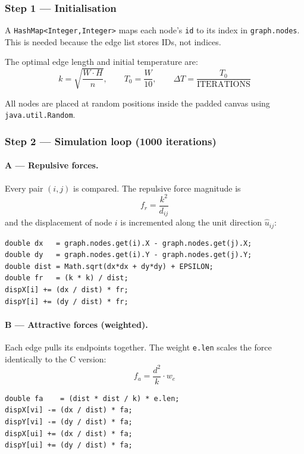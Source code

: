 \documentclass[12pt,a4paper]{article}
\begin{document}
\subsubsection*{Step 1 — Initialisation}

A \texttt{HashMap<Integer,Integer>} maps each node's \texttt{id} to its
index in \texttt{graph.nodes}. This is needed because the edge list stores
IDs, not indices.

The optimal edge length and initial temperature are:
\[
  k = \sqrt{\frac{W \cdot H}{n}}, \qquad
  T_0 = \frac{W}{10}, \qquad
  \Delta T = \frac{T_0}{\text{ITERATIONS}}
\]

All nodes are placed at random positions inside the padded canvas using
\texttt{java.util.Random}.

\subsubsection*{Step 2 — Simulation loop (1000 iterations)}

\paragraph{A — Repulsive forces.}
Every pair $(i,j)$ is compared. The repulsive force magnitude is
\[
  f_r = \frac{k^2}{d_{ij}}
\]
and the displacement of node $i$ is incremented along the unit direction
$\hat{u}_{ij}$:

\begin{lstlisting}[caption={Repulsive force accumulation}]
double dx   = graph.nodes.get(i).X - graph.nodes.get(j).X;
double dy   = graph.nodes.get(i).Y - graph.nodes.get(j).Y;
double dist = Math.sqrt(dx*dx + dy*dy) + EPSILON;
double fr   = (k * k) / dist;
dispX[i] += (dx / dist) * fr;
dispY[i] += (dy / dist) * fr;
\end{lstlisting}

\paragraph{B — Attractive forces (weighted).}
Each edge pulls its endpoints together. The weight \texttt{e.len} scales
the force identically to the C version:
\[
  f_a = \frac{d^2}{k} \cdot w_e
\]

\begin{lstlisting}[caption={Attractive force accumulation}]
double fa    = (dist * dist / k) * e.len;
dispX[vi] -= (dx / dist) * fa;
dispY[vi] -= (dy / dist) * fa;
dispX[ui] += (dx / dist) * fa;
dispY[ui] += (dy / dist) * fa;
\end{lstlisting}
\end{document}
